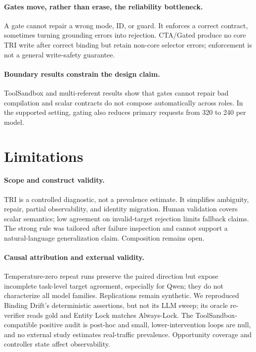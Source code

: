 \documentclass[letterpaper]{article}
\begin{document}
\paragraph{Gates move, rather than erase, the reliability bottleneck.}
A gate cannot repair a wrong mode, ID, or guard. It enforces a correct contract, sometimes turning
grounding errors into rejection. CTA/Gated produce no core TRI write after correct binding but
retain non-core selector errors; enforcement is not a general write-safety guarantee.

\paragraph{Boundary results constrain the design claim.}
ToolSandbox and multi-referent results show that gates cannot repair bad compilation and scalar
contracts do not compose automatically across roles. In the supported setting, gating also reduces
primary requests from 320 to 240 per model.

\section{Limitations}

\paragraph{Scope and construct validity.}
TRI is a controlled diagnostic, not a prevalence estimate. It simplifies ambiguity, repair,
partial observability, and identity migration. Human validation covers scalar semantics; low
agreement on invalid-target rejection limits fallback claims. The strong rule was tailored after
failure inspection and cannot support a natural-language generalization claim. Composition remains open.

\paragraph{Causal attribution and external validity.}
Temperature-zero repeat runs preserve the paired direction but expose incomplete task-level target
agreement, especially for Qwen; they do not characterize all model families. Replications remain
synthetic. We reproduced Binding Drift's deterministic assertions, but not its LLM sweep;
its oracle re-verifier reads gold and Entity Lock matches Always-Lock. The ToolSandbox-compatible
positive audit is post-hoc and small, lower-intervention loops are null, and no external study
estimates real-traffic prevalence. Opportunity coverage and controller state affect observability.
\end{document}

